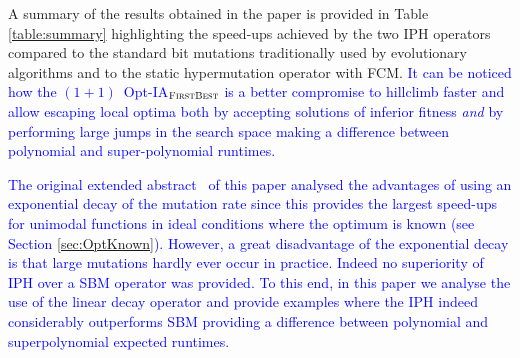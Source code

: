 \documentclass[lettersize,journal]{IEEEtran}
\newcommand{\new}[1]{\textcolor{blue}{#1}}
\begin{document}


A summary of the results obtained in the paper is provided in Table \ref{table:summary} highlighting the speed-ups achieved by the two IPH operators compared to the standard bit mutations traditionally  used by evolutionary algorithms and to the static hypermutation operator with FCM.
\new{It can be noticed how the $(1+1)$~Opt-IA$_{\textsc{FirstBest}}$ is a better compromise to hillclimb faster and allow escaping local optima both by accepting solutions of inferior fitness {\it and} by performing large jumps in the search space making a difference between polynomial and super-polynomial runtimes.}

\new{The original extended abstract~\cite{CorusOlivetoYazdaniIPH2019} of this paper analysed the advantages of using an exponential decay of the mutation rate since this provides the largest speed-ups for unimodal functions in ideal conditions where the optimum is known (see Section \ref{sec:OptKnown}). However, a great disadvantage of the exponential decay is that large mutations hardly ever occur in practice. Indeed no superiority of IPH over a SBM operator was provided.  To this end, in this paper we analyse the use of the linear decay operator and  provide examples where the IPH indeed considerably outperforms SBM providing a difference between polynomial and superpolynomial expected runtimes.}
\end{document}
